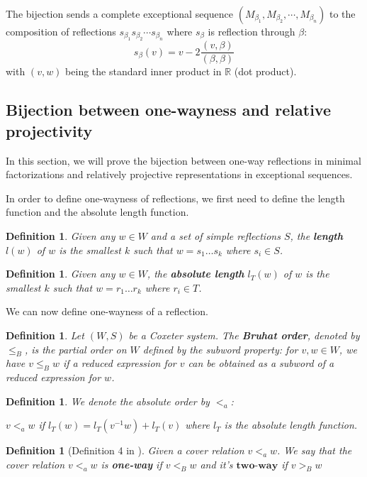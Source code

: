 \documentclass[11pt]{amsart}
\newtheorem{defi}[thm]{Definition}%
\begin{document}
The bijection sends a complete exceptional sequence $(M_{\beta_1},M_{\beta_2},\cdots,M_{\beta_n})$ to the composition of reflections $s_{\beta_1}s_{\beta_2}\cdots s_{\beta_n}$ where $s_\beta$ is reflection through $\beta$:
\[
	s_\beta(v)=v-2\frac{(v,\beta)}{(\beta,\beta)}
\]
with $(v,w)$ being the standard inner product in $\mathbb R$ (dot product).

\subsection{Bijection between one-wayness and relative projectivity}
In this section, we will prove the bijection between one-way reflections in minimal factorizations and relatively projective representations in exceptional sequences.

In order to define one-wayness of reflections, we first need to define the length function and the absolute length function.

\begin{defi}
    Given any $w\in W$ and a set of simple reflections $S$, the \textbf{length} $l(w)$ of $w$ is the smallest $k$ such that $w=s_1\dots s_k$ where $s_i \in S$.
\end{defi}

\begin{defi}
    Given any $w\in W$, the \textbf{absolute length} $l_T(w)$ of $w$ is the smallest $k$ such that $w=r_1\dots r_k$ where $r_i \in T$.
\end{defi}

We can now define one-wayness of a reflection.

\begin{defi}
Let $(W, S)$ be a Coxeter system. The \textbf{Bruhat order}, denoted by $\le_B$, is the partial order on $W$ defined by the subword property: for $v, w \in W$, we have $v \le_B w$ if a reduced expression for $v$ can be obtained as a subword of a reduced expression for $w$.
\end{defi}

\begin{defi}
    We denote the absolute order by $<_a$:

    $v <_a w$ if $l_T(w)=l_T(v^{-1}w)+l_T(v)$ where $l_T$ is the absolute length function.
\end{defi}

\begin{defi} [Definition 4 in \cite{biane2019noncrossing}]
    Given a cover relation $v <_a w$. We say that the cover relation $v <_a w$ is \textbf{one-way} if $v <_B w$ and it's $\textbf{two-way}$ if $v >_B w$
\end{defi}
\end{document}
